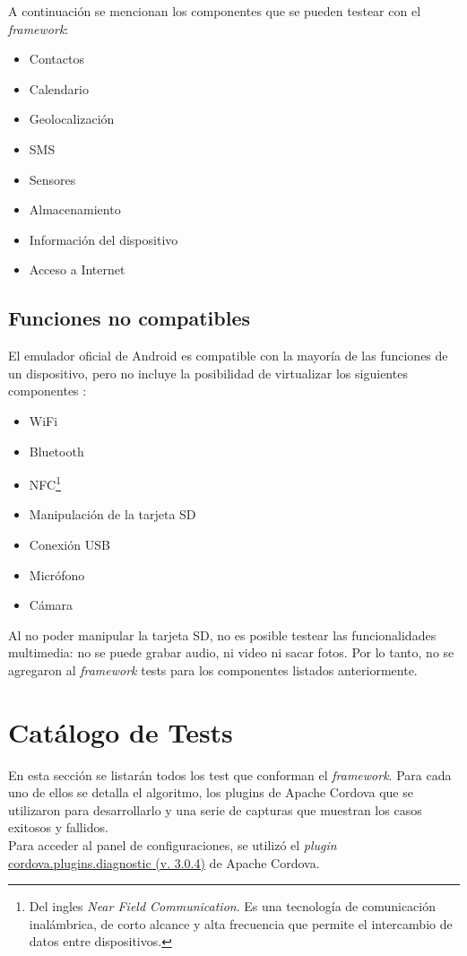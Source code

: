 A continuación se mencionan los componentes que se pueden testear con el \textit{framework}:
\begin{itemize}
	\item Contactos
	\item Calendario
	\item Geolocalización
	\item SMS
	\item Sensores
	\item Almacenamiento
	\item Información del dispositivo
	\item Acceso a Internet
\end{itemize}
\subsection{Funciones no compatibles}
El emulador oficial de Android es compatible con la mayoría de las funciones de un dispositivo, pero no incluye la posibilidad de virtualizar los siguientes componentes \cite{daemu}:
\begin{itemize}
    \item WiFi
    \item Bluetooth
    \item NFC\footnote{Del ingles \emph{Near Field Communication}. Es una tecnología de comunicación inalámbrica, de corto alcance y alta frecuencia que permite el intercambio de datos entre dispositivos.}
    \item Manipulación de la tarjeta SD
    \item Conexión USB
    \item Micrófono
    \item Cámara
\end{itemize}
Al no poder manipular la tarjeta SD, no es posible testear las funcionalidades multimedia: no se puede grabar audio, ni video ni sacar fotos. Por lo tanto, no se agregaron al \textit{framework} tests para los componentes listados anteriormente.
\section{Catálogo de Tests}
En esta sección se listarán todos los test que conforman el \textit{framework}. Para cada uno de ellos se detalla el algoritmo, los plugins de Apache Cordova que se utilizaron para desarrollarlo y una serie de capturas que muestran los casos exitosos y fallidos.\\

Para acceder al panel de configuraciones, se utilizó el \textit{plugin} \href{https://www.npmjs.com/package/cordova.plugins.diagnostic}{cordova.plugins.diagnostic (v. 3.0.4)} de Apache Cordova.\\

